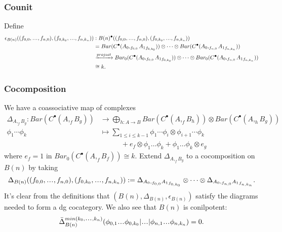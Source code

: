 \subsubsection{Counit}
Define
\begin{align*}
\epsilon_{B(n)}((f_{0,0},\smdots,f_{n,0}), 
  (f_{0,k_0},\smdots,f_{n,k_n}))
&: 
B(n)^\bullet((f_{0,0},\smdots,f_{n,0}), 
  (f_{0,k_0},\smdots,f_{n,k_n}))\\
&= 
Bar(C^\bullet(A_0, _{f_{0,0}}{A_1}_{f_{0,k_0}})) 
  \otimes \cdots \otimes 
  Bar(C^\bullet(A_0, _{f_{n,0}}{A_1}_{f_{n,k_n}}))\\
&\xrightarrow{project}
Bar_0(C^\bullet(A_0, _{f_{0,0}}{A_1}_{f_{0,k_0}})) 
  \otimes \cdots \otimes 
  Bar_0(C^\bullet(A_0, _{f_{n,0}}{A_1}_{f_{n,k_n}}))\\
&\cong k.
\end{align*}
%
\subsubsection{Cocomposition}
We have a coassociative map of complexes
%
\begin{align*}
\Delta_{A, _fB_g}: Bar(C^\bullet(A, _fB_g)) 
&\to \bigoplus\limits_{h: A \to B} Bar(C^\bullet(A, _fB_h)) \otimes Bar(C^\bullet(A, _hB_g)) \\
\phi_1 \cdots \phi_k 
&\mapsto \sum\limits_{1\leq i \leq k-1} 
\phi_1 \cdots \phi_i \otimes 
  \phi_{i+1} \cdots \phi_k\\
&\phantom{{}\mapsto \sum{}}
  + e_f\otimes \phi_1 \dots \phi_k + 
  \phi_1 \dots \phi_k \otimes e_g  
\end{align*}
%
where 
$e_f = 1$ in $Bar_0(C^\bullet(A, _fB_f)) \cong k$.
Extend $\Delta_{A, _fB_g}$ to a 
cocomposition on $B(n)$ by taking
$$
\Delta_{B(n)}((f_{0,0},\smdots,f_{n,0}), 
  (f_{0,k_0},\smdots,f_{n,k_n})) :=
\Delta_{A_0, _{f_{0,0}}{A_1}_{f_{0,k_0}}} 
\otimes \dots \otimes
\Delta_{A_0, _{f_{n,0}}{A_1}_{f_{n,k_n}}}.
$$
%
It's clear from the definitions that
$(B(n), \Delta_{B(n)}, \epsilon_{B(n)})$ 
satisfy the diagrams needed to form a dg cocategory. 
We also see that $B(n)$ is conilpotent: 
$$
\bar{\Delta}_{B(n)}^{min(k_0,\smdots,k_n)}
(\phi_{0,1}\smdots\phi_{0,k_0}|\smdots|
\phi_{n,1}\smdots\phi_{n,k_n}) = 0.
$$
